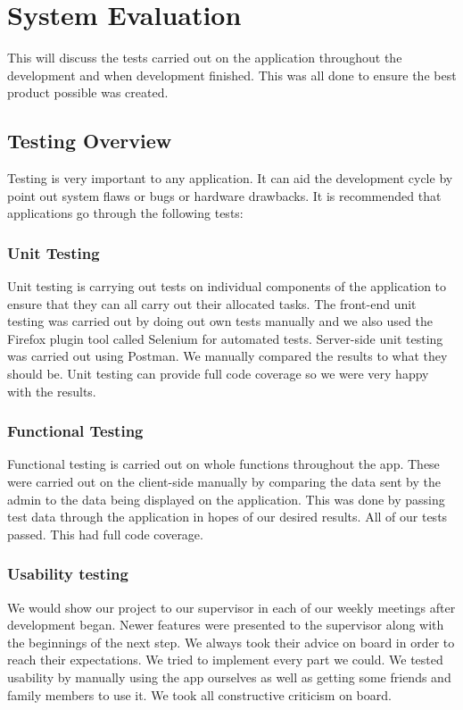 \chapter{System Evaluation}
This will discuss the tests carried out on the application throughout the development and when development finished. This was all done to ensure the best product possible was created.
\section{Testing Overview}
Testing is very important to any application. It can aid the development cycle by point out system flaws or bugs or hardware drawbacks. It is recommended that applications go through the following tests:
\subsection{Unit Testing}
Unit testing is carrying out tests on individual components of the application to ensure that they can all carry out their allocated tasks. The front-end unit testing was carried out by doing out own tests manually and we also used the Firefox plugin tool called Selenium for automated tests. Server-side unit testing was carried out using Postman. We manually compared the results to what they should be. Unit testing can provide full code coverage so we were very happy with the results.
\subsection{Functional Testing}
Functional testing is carried out on whole functions throughout the app. These were carried out on the client-side manually by comparing the data sent by the admin to the data being displayed on the application. This was done by passing test data through the application in hopes of our desired results. All of our tests passed. This had full code coverage. 
\subsection{Usability testing}
We would show our project to our supervisor in each of our weekly meetings after development began. Newer features were presented to the supervisor along with the beginnings of the next step. We always took their advice on board in order to reach their expectations. We tried to implement every part we could. We tested usability by manually using the app ourselves as well as getting some friends and family members to use it. We took all constructive criticism on board.
